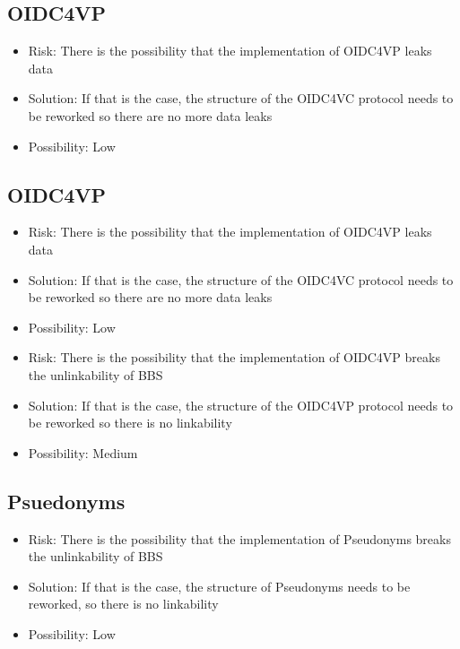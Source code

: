 \documentclass[
	a4paper               %
	,bibliography=totoc   %
	,listof=totoc         %
	,monolingual
	twoside=false,
]{bfhthesis}              %
\begin{document}
\subsection{OIDC4VP}
\begin{itemize}
	\item Risk: There is the possibility that the implementation of OIDC4VP leaks data
	\item Solution: If that is the case, the structure of the OIDC4VC protocol needs to be reworked so there are no more data leaks
	\item Possibility: Low
\end{itemize}

\subsection{OIDC4VP}
\begin{itemize}
	\item Risk: There is the possibility that the implementation of OIDC4VP leaks data
	\item Solution: If that is the case, the structure of the OIDC4VC protocol needs to be reworked so there are no more data leaks
	\item Possibility: Low
\end{itemize}
\begin{itemize}
	\item Risk: There is the possibility that the implementation of OIDC4VP breaks the unlinkability of BBS
	\item Solution: If that is the case, the structure of the OIDC4VP protocol needs to be reworked so there is no linkability
	\item Possibility: Medium
\end{itemize}

\subsection{Psuedonyms}
\begin{itemize}
	\item Risk: There is the possibility that the implementation of Pseudonyms breaks the unlinkability of BBS
	\item Solution: If that is the case, the structure of Pseudonyms needs to be reworked, so there is no linkability
	\item Possibility: Low
\end{itemize}
\end{document}
